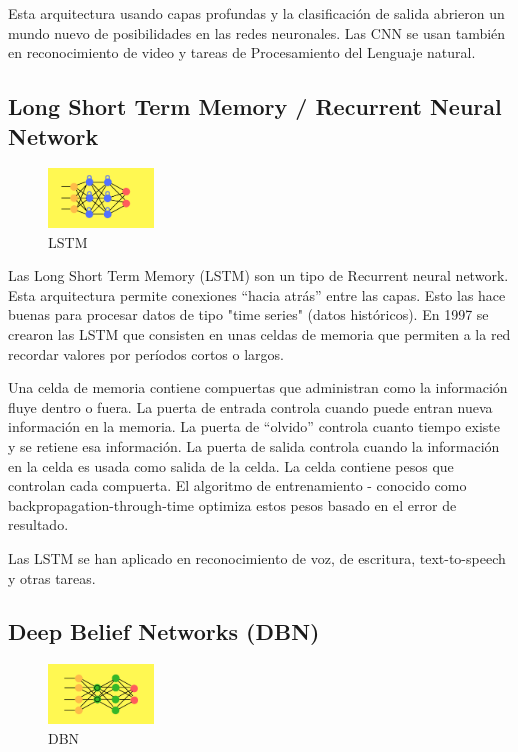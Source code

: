 \documentclass[a4paper]{article}
\begin{document}
Esta arquitectura usando capas profundas y la clasificación de 
salida abrieron un mundo nuevo de posibilidades en las redes 
neuronales. Las CNN se usan también en reconocimiento de video y 
tareas de Procesamiento del Lenguaje natural. 


\subsection{Long Short Term Memory / Recurrent Neural Network}
\begin{figure} %
    \centering
    \includegraphics[width=0.25\textwidth]{./images/net_lstm.png}
    \caption{LSTM}
\end{figure}

Las Long Short Term Memory (LSTM) son un tipo de Recurrent neural 
network. Esta arquitectura permite conexiones ``hacia atrás'' entre 
las capas. Esto las hace buenas para procesar datos de tipo "time 
series" (datos históricos). En 1997 se crearon las LSTM que 
consisten en unas celdas de memoria que permiten a la red recordar 
valores por períodos cortos o largos.

Una celda de memoria contiene compuertas que administran como la 
información fluye dentro o fuera. La puerta de entrada controla 
cuando puede entran nueva información en la memoria. La puerta de 
``olvido'' controla cuanto tiempo existe y se retiene esa 
información. La puerta de salida controla cuando la información en 
la celda es usada como salida de la celda. La celda contiene pesos 
que controlan cada compuerta. El algoritmo de entrenamiento -
conocido como backpropagation-through-time optimiza estos pesos 
basado en el error de resultado.

Las LSTM se han aplicado en reconocimiento de voz, de escritura, 
text-to-speech y otras tareas.


\subsection{Deep Belief Networks (DBN)}
\begin{figure} %
    \centering
    \includegraphics[width=0.25\textwidth]{./images/deep_belief.png}
    \caption{DBN}
\end{figure}
\end{document}
